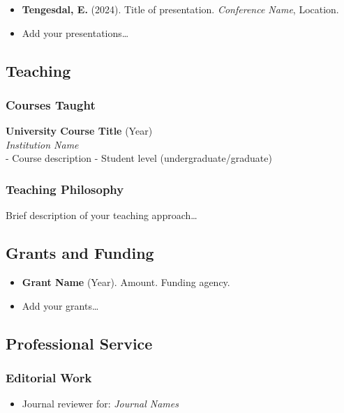\documentclass[
]{article}
\providecommand{\tightlist}{%
  \setlength{\itemsep}{0pt}\setlength{\parskip}{0pt}}\usepackage{longtable,booktabs,array}
\begin{document}
\begin{itemize}
\tightlist
\item
  \textbf{Tengesdal, E.} (2024). Title of presentation. \emph{Conference
  Name}, Location.
\item
  Add your presentations\ldots{}
\end{itemize}

\subsection{Teaching}\label{teaching}

\subsubsection{Courses Taught}\label{courses-taught}

\textbf{University Course Title} (Year)\\
\emph{Institution Name}\\
- Course description - Student level (undergraduate/graduate)

\subsubsection{Teaching Philosophy}\label{teaching-philosophy}

Brief description of your teaching approach\ldots{}

\subsection{Grants and Funding}\label{grants-and-funding}

\begin{itemize}
\tightlist
\item
  \textbf{Grant Name} (Year). Amount. Funding agency.
\item
  Add your grants\ldots{}
\end{itemize}

\subsection{Professional Service}\label{professional-service}

\subsubsection{Editorial Work}\label{editorial-work}

\begin{itemize}
\tightlist
\item
  Journal reviewer for: \emph{Journal Names}
\end{itemize}
\end{document}
